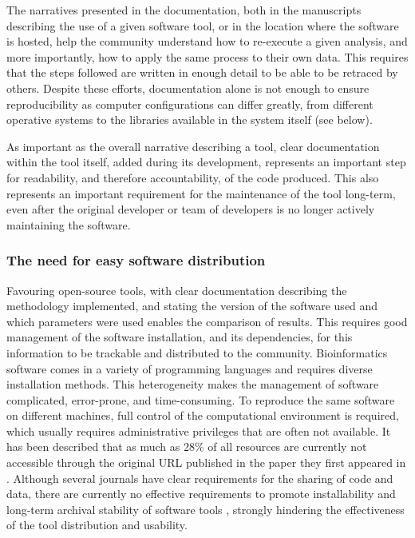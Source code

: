 The narratives presented in the documentation, both in the manuscripts describing the use of a given software tool, or in the location where the software is hosted, help the community understand how to re-execute a given analysis, and more importantly, how to apply the same process to their own data. This requires that the steps followed are written in enough detail to be able to be retraced by others. Despite these efforts, documentation alone is not enough to ensure reproducibility as computer configurations can differ greatly, from different operative systems to the libraries available in the system itself (see below). 

As important as the overall narrative describing a tool, clear documentation within the tool itself, added during its development, represents an important step for readability, and therefore accountability, of the code produced. This also represents an important requirement for the maintenance of the tool long-term, even after the original developer or team of developers is no longer actively maintaining the software. 

\subsubsection{The need for easy software distribution}

Favouring open-source tools, with clear documentation describing the methodology implemented, and stating the version of the software used and which parameters were used enables the comparison of results. This requires good management of the software installation, and its dependencies, for this information to be trackable and distributed to the community. Bioinformatics software comes in a variety of programming languages and requires diverse installation methods. This heterogeneity makes the management of software complicated, error-prone, and time-consuming. To reproduce the same software on different machines, full control of the computational environment is required, which usually requires administrative privileges that are often not available.  It has been described that as much as 28\% of all resources are currently not accessible through the original \ac{URL} published in the paper they first appeared in \citep{mangul_challenges_2019}. Although several journals have clear requirements for the sharing of code and data, there are currently no effective requirements to promote installability and long-term archival stability of software tools \citep{mangul_challenges_2019}, strongly hindering the effectiveness of the tool distribution and usability. 

